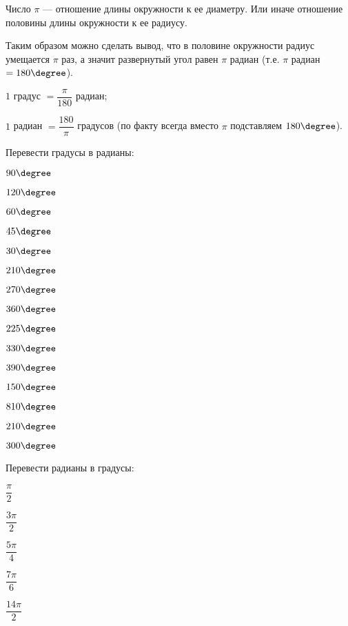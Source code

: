 \begin{class}[number=3]
\begin{definit}
	\end{definit}
	\begin{definit}
		Число \( \pi \) --- отношение длины окружности к ее диаметру. Или иначе отношение половины длины окружности к ее радиусу.
	\end{definit}
	Таким образом можно сделать вывод, что в половине окружности радиус умещается \( \pi \) раз, а значит развернутый угол равен \( \pi \) радиан (т.е. \( \pi \) радиан \( = 180\degree \)).
	\begin{enumcols}
		\item \( 1 \) градус \( = \dfrac{\pi}{180} \) радиан;
		\item \( 1 \) радиан \( = \dfrac{180}{\pi}\) градусов (по факту всегда вместо \( \pi \) подставляем \( 180\degree \)).
	\end{enumcols}
	\begin{listofex}[resume]
		\item Перевести градусы в радианы:
		\begin{enumcols}[itemcolumns=5]
			\item \( 90\degree \)
			\item \( 120\degree \)
			\item \( 60\degree \)
			\item \( 45\degree \)
			\item \( 30\degree \)
			\item \( 210\degree \)
			\item \( 270\degree \)
			\item \( 360\degree \)
			\item \( 225\degree \)
			\item \( 330\degree \)
			\item \( 390\degree \)
			\item \( 150\degree \)
			\item \( 810\degree \)
			\item \( 210\degree \)
			\item \( 300\degree \)
		\end{enumcols}
		\newpage
		\item Перевести радианы в градусы:
		\begin{enumcols}[itemcolumns=5]
			\item \( \dfrac{\pi}{2} \)
			\item \( \dfrac{3\pi}{2} \)
			\item \( \dfrac{5\pi}{4} \)
			\item \( \dfrac{7\pi}{6} \)
			\item \( \dfrac{14\pi}{2} \)

\end{enumcols}
\end{listofex}
\end{class}
